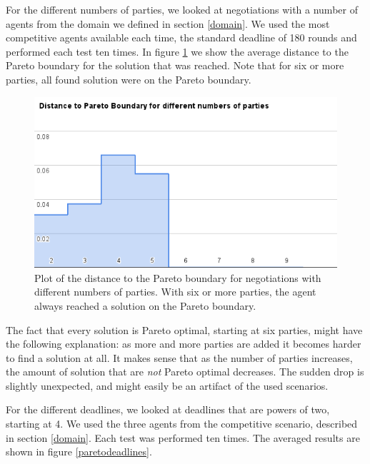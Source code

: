 \documentclass[a4,11pt]{scrartcl}
\begin{document}
For the different numbers of parties, we looked at negotiations with
a number of agents from the domain we defined in section \ref{domain}.
We used the most competitive agents available each time, the standard
deadline of 180 rounds and performed each test ten times. In figure
\ref{paretoparties} we show the average distance to the Pareto boundary
for the solution that was reached. Note that for six or more parties,
all found solution were on the Pareto boundary.

\begin{figure}[t]
    \includegraphics[width=\textwidth]{paretoparties.png}
    \caption{Plot of the distance to the Pareto boundary for negotiations
    with different numbers of parties. With six or more parties, the
    agent always reached a solution on the Pareto boundary.}
    \label{paretoparties}
\end{figure}

The fact that every solution is Pareto optimal, starting at six parties,
might have the following explanation: as more and more parties are added
it becomes harder to find a solution at all. It makes sense that as the
number of parties increases, the amount of solution that are \emph{not}
Pareto optimal decreases. The sudden drop is slightly unexpected, and
might easily be an artifact of the used scenarios.

For the different deadlines, we looked at deadlines that are powers of 
two, starting at 4. We used the three agents from the competitive 
scenario, described in section \ref{domain}. Each test was performed 
ten times. The averaged results are shown in figure 
\ref{paretodeadlines}.
\end{document}
